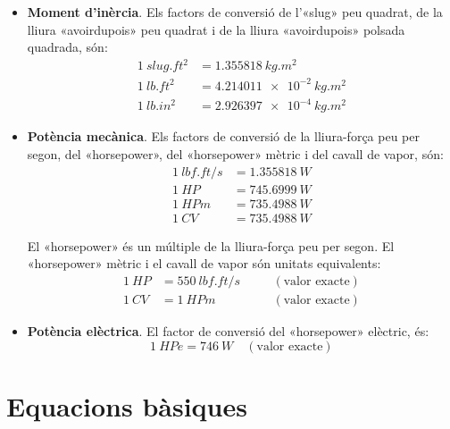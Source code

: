 \begin{itemize}
    \item \textbf{Moment d'inèrcia}. Els factors de conversió de l'«slug» peu quadrat, de la lliura «avoirdupois» peu quadrat   i de la lliura «avoirdupois» polsada quadrada, són:
    \begin{subequations}
    \begin{align}
        \SI{1}{slug.ft^2} &= \SI{1,355818}{kg.m^2} \\
        \SI{1}{lb.ft^2} &= \SI{4,214011e-2}{kg.m^2} \\
        \SI{1}{lb.in^2} &= \SI{2,926397e-4}{kg.m^2}
    \end{align}
    \end{subequations}

    \item \textbf{Potència mecànica}. Els factors de conversió de la lliura-força peu per segon, del «horsepower»,  del «horsepower» mètric i del cavall de vapor, són:
    \begin{subequations}
    \begin{align}
      \SI{1}{lbf.ft/s} &= \SI{1,355818}{W} \\
      \SI{1}{HP} &= \SI{745,6999}{W} \\
      \SI{1}{HPm} &= \SI{735,4988}{W} \\
      \SI{1}{CV} &= \SI{735,4988}{W}
    \end{align}
    \end{subequations}

    El «horsepower» és un múltiple  de la lliura-força peu per segon. El «horsepower» mètric i el cavall de vapor són unitats equivalents:
    \begin{subequations}
    \begin{alignat}{3}
      \SI{1}{HP} &= \SI{550}{lbf.ft/s}  &&\quad(\text{valor exacte}) \\
      \SI{1}{CV} &= \SI{1}{HPm} &&\quad(\text{valor exacte})
    \end{alignat}
    \end{subequations}


    \item \textbf{Potència elèctrica}. El factor de conversió del
    «horsepower» elèctric, és:
    \begin{equation}
        \SI{1}{HPe} = \SI{746}{W}\quad(\text{valor exacte})
    \end{equation}
  \end{itemize}


\section{Equacions bàsiques}

